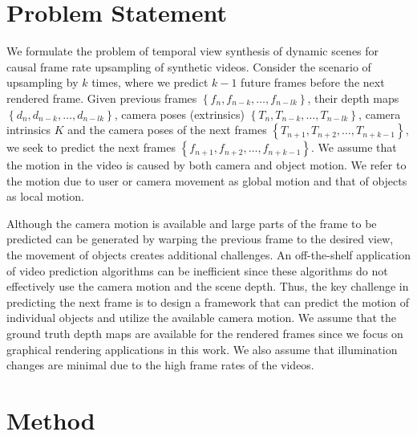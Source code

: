 \documentclass[preprint]{vgtc}
\begin{document}
    \section{Problem Statement}\label{sec:problem-statement}
    We formulate the problem of temporal view synthesis of dynamic scenes for causal frame rate upsampling of synthetic videos.
    Consider the scenario of upsampling by $k$ times, where we predict $k-1$ future frames before the next rendered frame.
    Given previous frames $ \left\{ f_{n},f_{n-k},\ldots, f_{n-lk} \right\} $, their depth maps $ \left\{ d_{n},d_{n-k},\ldots, d_{n-lk} \right\} $, camera poses (extrinsics) $ \left\{ T_{n},T_{n-k},\ldots, T_{n-lk} \right\} $, camera intrinsics $K$ and the camera poses of the next frames $ \left\{ T_{n+1}, T_{n+2}, \ldots, T_{n+k-1} \right\} $, we seek to predict the next frames $ \left\{ f_{n+1}, f_{n+2}, \ldots, f_{n+k-1} \right\} $.
    We assume that the motion in the video is caused by both camera and object motion.
    We refer to the motion due to user or camera movement as global motion and that of objects as local motion.

    Although the camera motion is available and large parts of the frame to be predicted can be generated by warping the previous frame to the desired view, the movement of objects creates additional challenges.
    An off-the-shelf application of video prediction algorithms can be inefficient since these algorithms do not effectively use the camera motion and the scene depth.
    Thus, the key challenge in predicting the next frame is to design a framework that can predict the motion of individual objects and utilize the available camera motion.
We assume that the ground truth depth maps are available for the rendered frames since we focus on graphical rendering applications in this work.
We also assume that illumination changes are minimal due to the high frame rates of the videos.


    \section{Method}\label{sec:method}
\end{document}
